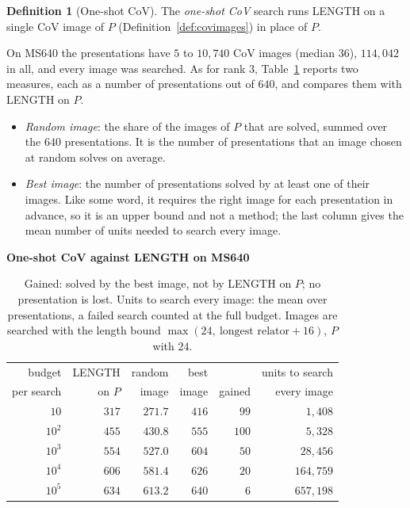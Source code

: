 \documentclass[11pt]{article}
\theoremstyle{definition}
\newtheorem{definition}[theorem]{Definition}
\theoremstyle{remark}
\begin{document}
\begin{definition}[One-shot CoV]\label{def:oneshot}
The \emph{one-shot CoV} search runs LENGTH on a single CoV image of $P$ (Definition~\ref{def:covimages}) in place of
$P$.
\end{definition}

On MS640 the presentations have $5$ to $10{,}740$ CoV images (median $36$), $114{,}042$ in all, and every image was
searched. As for rank $3$, Table~\ref{tab:cov_all} reports two measures, each as a number of presentations out of
$640$, and compares them with LENGTH on $P$.
\begin{itemize}
  \item \emph{Random image}: the share of the images of $P$ that are solved, summed over the $640$ presentations. It is
  the number of presentations that an image chosen at random solves on average.
  \item \emph{Best image}: the number of presentations solved by at least one of their images. Like some word, it
  requires the right image for each presentation in advance, so it is an upper bound and not a method; the last
  column gives the mean number of units needed to search every image.
\end{itemize}

\begin{table}[ht]
\centering
\small
\textbf{One-shot CoV against LENGTH on MS640}\par\smallskip
\begin{tabular}{rrrrrr}
\toprule
budget & LENGTH & random & best & & units to search\\
per search & on $P$ & image & image & gained & every image\\
\midrule
$10$ & $317$ & $271.7$ & $416$ & $99$ & $1{,}408$\\
$10^2$ & $455$ & $430.8$ & $555$ & $100$ & $5{,}328$\\
$10^3$ & $554$ & $527.0$ & $604$ & $50$ & $28{,}456$\\
$10^4$ & $606$ & $581.4$ & $626$ & $20$ & $164{,}759$\\
$10^5$ & $634$ & $613.2$ & $640$ & $6$ & $657{,}198$\\
\bottomrule
\end{tabular}
\caption{Gained: solved by the best image, not by LENGTH on $P$; no presentation is lost. Units to search every image:
the mean over presentations, a failed search counted at the full budget. Images are searched with the length bound
$\max(24,\ \text{longest relator}+16)$, $P$ with $24$.}
\label{tab:cov_all}
\end{table}
\end{document}
